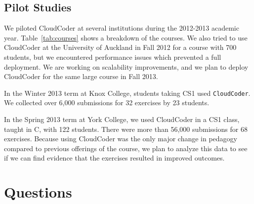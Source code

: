 \documentclass{sig-alternate}
\begin{document}
\subsection{Pilot Studies}

We piloted CloudCoder at several institutions during the 2012-2013
academic year.  Table~\ref{tab:courses} shows a breakdown of the
courses.  We also tried to use CloudCoder at the University of Auckland in Fall 2012 for a
course with 700 students, but we encountered performance issues
which prevented a full deployment.  We are working on scalability
improvements, and we plan to deploy CloudCoder for
the same large course in Fall 2013.

In the Winter 2013 term at Knox College, students taking CS1 used {\tt CloudCoder}.
We collected over 6,000 submissions
for 32 exercises by 23 students.

In the Spring 2013 term at York College, we used CloudCoder in a CS1
class, taught in C, with 122 students.  There were more than 56,000
submissions for 68 exercises.  Because using CloudCoder was the
only major change in pedagogy compared to previous offerings of the course,
we plan to analyze this data to see if we can find evidence that
the exercises resulted in improved outcomes.



\section{Questions}\label{sec:questions}

%
\end{document}
